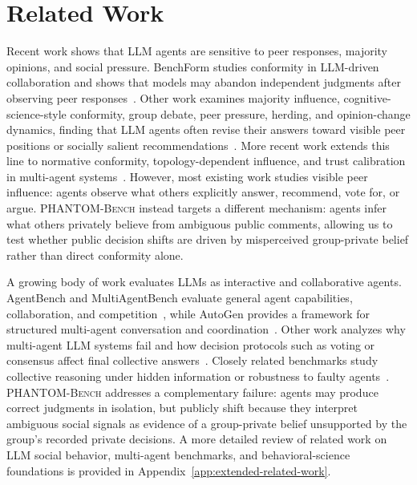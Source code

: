 \documentclass{article}
\begin{document}
\section{Related Work}

Recent work shows that LLM agents are sensitive to peer responses, majority opinions, and social pressure. BenchForm studies conformity in LLM-driven collaboration and shows that models may abandon independent judgments after observing peer responses~\cite{weng2025benchform}. Other work examines majority influence, cognitive-science-style conformity, group debate, peer pressure, herding, and opinion-change dynamics, finding that LLM agents often revise their answers toward visible peer positions or socially salient recommendations~\cite{song2025kairos,zhu2024conformityllm,tao2025herdbehavior,choi2025groupconformity,shi2025opinionchange}. More recent work extends this line to normative conformity, topology-dependent influence, and trust calibration in multi-agent systems~\cite{bito2026normative,han2026conformitydynamics,zhou2026epistemiccontext}. However, most existing work studies visible peer influence: agents observe what others explicitly answer, recommend, vote for, or argue. \textsc{PHANTOM-Bench} instead targets a different mechanism: agents infer what others privately believe from ambiguous public comments, allowing us to test whether public decision shifts are driven by misperceived group-private belief rather than direct conformity alone.

A growing body of work evaluates LLMs as interactive and collaborative agents. AgentBench and MultiAgentBench evaluate general agent capabilities, collaboration, and competition~\cite{liu2024agentbench,zhu-etal-2025-multiagentbench}, while AutoGen provides a framework for structured multi-agent conversation and coordination~\cite{wu2024autogen}. Other work analyzes why multi-agent LLM systems fail and how decision protocols such as voting or consensus affect final collective answers~\cite{cemri2025masfailures,kaesberg-etal-2025-voting}. Closely related benchmarks study collective reasoning under hidden information or robustness to faulty agents~\cite{li2025hiddenbench,huang2025resilience}. \textsc{PHANTOM-Bench} addresses a complementary failure: agents may produce correct judgments in isolation, but publicly shift because they interpret ambiguous social signals as evidence of a group-private belief unsupported by the group's recorded private decisions. A more detailed review of related work on LLM social behavior, multi-agent benchmarks, and behavioral-science foundations is provided in Appendix~\ref{app:extended-related-work}.
\end{document}
